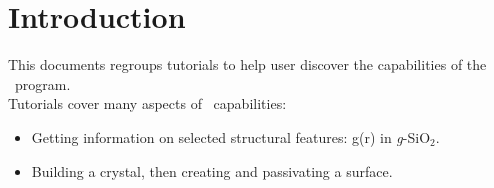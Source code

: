 \chapter{Introduction}
\label{introtuto}

This documents regroups tutorials to help user discover the capabilities of the \atomes\ program. \\
Tutorials cover many aspects of \atomes\ capabilities:
\begin{itemize}
\item Getting information on selected structural features: g(r) in {\it{g}}-SiO$_2$.
\item Building a crystal, then creating and passivating a surface.
\end{itemize}
 

